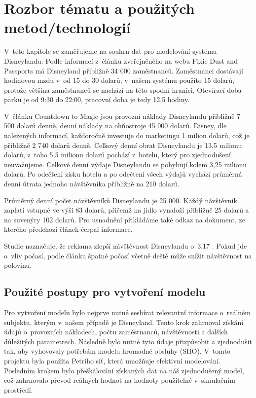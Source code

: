 \chapter{Rozbor tématu a použitých metod/technologií}
V~této kapitole se zaměřujeme na souhrn dat pro modelování systému Disneylandu. Podle informací z~článku zveřejněného na webu Pixie Dust and Passports\cite{grace2023} má Disneyland přibližně 34 000 zaměstnanců. Zaměstnanci dostávají hodinovou mzdu v~od 15 do 30 dolarů, v~našem systému použito 15 dolarů, protože většina zaměstnanců se nachází na této spodní hranici. Otevírací doba parku je od 9:30 do 22:00, pracovní doba je tedy 12,5 hodiny.

V~článku Countdown to Magic\cite{michael2024} jsou provozní náklady Disneylandu přibližně 7 500 dolarů denně, denní náklady na ohňostroje 45 000 dolarů. Disney, dle nalezených informací, každoročně investuje do marketingu 1 milion dolarů, což je přibližně 2 740 dolarů denně. Celkový denní obrat Disneylandu je 13,5 milionu dolarů, z~toho 5,5 milionu dolarů pochází z~hotelu, který pro zjednodušení neuvažujeme. Celkové denní výdaje Disneylandu se pohybují kolem 3,25 milionu dolarů. Po odečtení zisku hotelu a po odečtení všech výdajů vychází průměrná denní útrata jednoho návštěvníka přibližně na 210 dolarů.

Průměrný denní počet návštěvníků Disneylandu je 25 000. Každý návštěvník zaplatí vstupné ve výši 83 dolarů, přičemž na jídlo vynaloží přibližně 25 dolarů a na suvenýry 102 dolarů. Pro usnadnění přikládáme také odkaz na dokument, ze kterého předchozí článek čerpal informace\cite{disney2022}.

Studie naznačuje, že reklama zlepší návštěvnost Disneylandu o~3,17 \cite{smith2024}. Pokud jde o~vliv počasí, podle článku špatné počasí včetně deště může snížit návštěvnost na polovinu\cite{joo2012}.

\section{Použité postupy pro vytvoření modelu} 
Pro vytvoření modelu bylo nejprve nutné sesbírat relevantní informace o~reálném subjektu, kterým v~našem případě je Disneyland. Tento krok zahrnoval získání údajů o~provozních nákladech, počtu zaměstnanců, návštěvnosti a dalších důležitých parametrech. Následně bylo nutné tyto údaje přizpůsobit a zjednodušit tak, aby vyhovovaly potřebám modelu hromadné obsluhy (SHO). V~tomto projektu byla použita Petriho síť, která umožňuje efektivní modelování. Posledním krokem bylo přeškálování získaných dat na náš zjednodušený model, což zahrnovalo převod reálných hodnot na hodnoty použitelné v~simulačním prostředí.


